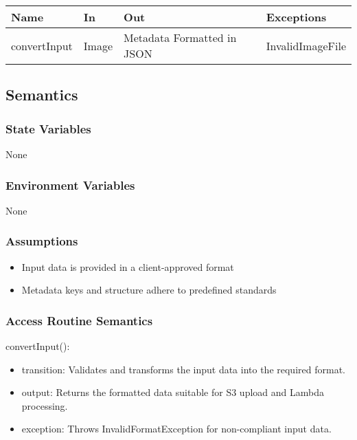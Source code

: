 \documentclass[12pt, titlepage]{article}
\begin{document}
\begin{center}
\begin{tabular}{p{2cm} p{4cm} p{4cm} p{2cm}}
\hline
\textbf{Name} & \textbf{In} & \textbf{Out} & \textbf{Exceptions} \\
\hline
convertInput & Image & Metadata Formatted in JSON & InvalidImageFile \\
\hline
\end{tabular}
\end{center}

\subsection{Semantics}

\subsubsection{State Variables}

None

\subsubsection{Environment Variables}

None

\subsubsection{Assumptions}

\begin{itemize}
  \item Input data is provided in a client-approved format
  \item Metadata keys and structure adhere to predefined standards
\end{itemize}

\subsubsection{Access Routine Semantics}

\noindent convertInput():
\begin{itemize}
\item transition: Validates and transforms the input data into the required format.
\item output: Returns the formatted data suitable for S3 upload and Lambda processing.
\item exception: Throws InvalidFormatException for non-compliant input data.
\end{itemize}
\end{document}
